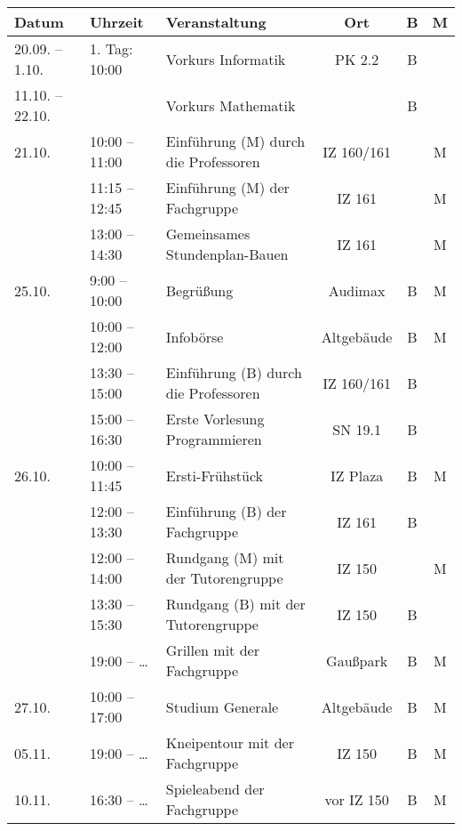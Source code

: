 \begin{tabular}{|l|l|p{6.7cm}|c|c|c|}
\hline \textbf{Datum} & \textbf{Uhrzeit} & \textbf{Veranstaltung}	& \textbf{Ort} & \textbf{B} & \textbf{M} \\
\hline 20.09. – 1.10.	& 1. Tag: 10:00	 & Vorkurs Informatik						& PK 2.2		&B& \\
\hline 11.10. – 22.10. 	&		 & Vorkurs Mathematik 								&				&B& \\
\hline 21.10.	& 10:00 – 11:00	 & Einführung (M) \newline durch die Professoren	& IZ 160/161	& &M\\
\hline 			& 11:15 – 12:45	 & Einführung (M) der Fachgruppe					& IZ 161		& &M\\
\hline 			& 13:00 – 14:30	 & Gemeinsames Stundenplan-Bauen					& IZ 161		& &M\\
\hline 25.10.	&  9:00 – 10:00	 & Begrüßung										& Audimax		&B&M\\ %
\hline 			& 10:00 – 12:00	 & Infobörse										& Altgebäude	&B&M\\
\hline 			& 13:30 – 15:00	 & Einführung (B) \newline durch die Professoren	& IZ 160/161	&B& \\
\hline 			& 15:00 – 16:30	 & Erste Vorlesung Programmieren					& SN 19.1		&B& \\
\hline 26.10.	& 10:00 – 11:45	 & Ersti-Frühstück									& IZ Plaza		&B&M\\
\hline 			& 12:00 – 13:30	 & Einführung (B) der Fachgruppe					& IZ 161		&B& \\
\hline 			& 12:00 – 14:00	 & Rundgang (M) \newline mit der Tutorengruppe		& IZ 150		& &M\\
\hline 			& 13:30 – 15:30	 & Rundgang (B) \newline mit der Tutorengruppe		& IZ 150		&B& \\
\hline 			& 19:00 – \ldots & Grillen mit der Fachgruppe						& Gaußpark		&B&M\\
\hline 27.10.	& 10:00 – 17:00	 & Studium Generale									& Altgebäude	&B&M\\
\hline 05.11.	& 19:00 – \ldots & Kneipentour mit der Fachgruppe					& IZ 150		&B&M\\
\hline 10.11.	& 16:30 – \ldots & Spieleabend der Fachgruppe						& vor IZ 150	&B&M\\ 
\hline
\end{tabular} 


